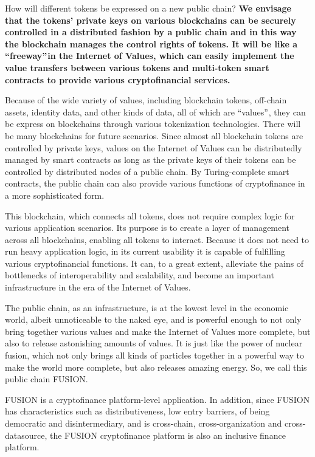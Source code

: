 \documentclass[a4paper,12pt]{article}
\begin{document}
How will different tokens be expressed on a new public chain? \textbf{We envisage that the tokens' private keys on various blockchains can be securely controlled in a distributed fashion by a public chain and in this way the blockchain manages the control rights of tokens. It will be like a “freeway” in the Internet of Values, which can easily implement the value transfers between various tokens and multi-token smart contracts to provide various cryptofinancial services. }

Because of the wide variety of values, including blockchain tokens, off-chain assets, identity data, and other kinds of data, all of which are “values” , they can be express on blockchains through various tokenization technologies. There will be many blockchains for future scenarios. Since almost all blockchain tokens are controlled by private keys, values on the Internet of Values can be distributedly managed by smart contracts as long as the private keys of their tokens can be controlled by distributed nodes of a public chain. By Turing-complete smart contracts, the public chain can also provide various functions of cryptofinance in a more sophisticated form.

This blockchain, which connects all tokens, does not require complex logic for various application scenarios. Its purpose is to create a layer of management across all blockchains, enabling all tokens to interact. Because it does not need to run heavy application logic, in its current usability it is capable of fulfilling various cryptofinancial functions. It can, to a great extent, alleviate the pains of bottlenecks of interoperability and scalability, and become an important infrastructure in the era of the Internet of Values.

The public chain, as an infrastructure, is at the lowest level in the economic world, albeit unnoticeable to the naked eye, and is powerful enough to not only bring together various values and make the Internet of Values more complete, but also to release astonishing amounts of values. It is just like the power of nuclear fusion, which not only brings all kinds of particles together in a powerful way to make the world more complete, but also releases amazing energy. So, we call this public chain FUSION.

FUSION is a cryptofinance platform-level application. In addition, since FUSION has characteristics such as distributiveness, low entry barriers, of being democratic and disintermediary, and is cross-chain, cross-organization and cross-datasource, the FUSION cryptofinance platform is also an inclusive finance platform.
\end{document}
